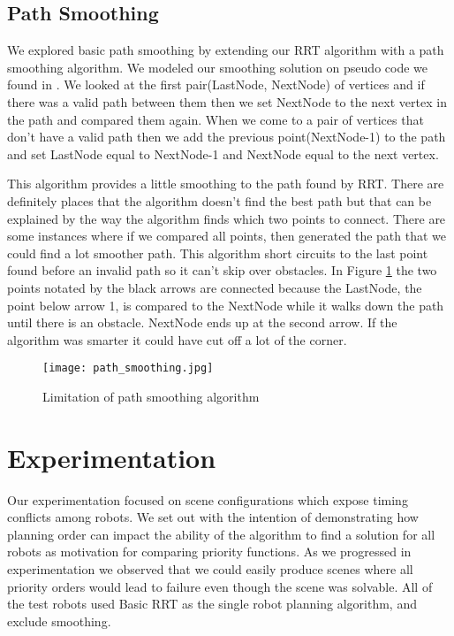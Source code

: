 \documentclass[12pt,journal,compsoc]{IEEEtran}
\begin{document}
\subsection{Path Smoothing}
We explored basic path smoothing by extending our RRT algorithm with a path smoothing algorithm. We modeled our smoothing solution on pseudo code we found in \cite{jarvis}. We looked at the first pair(LastNode, NextNode) of vertices and if there was a valid path between them then we set NextNode to the next vertex in the path and compared them again.  When we come to a pair of vertices that don't have a valid path then we add the previous point(NextNode-1) to the path and set LastNode equal to NextNode-1 and NextNode equal to the next vertex.  
\par
This algorithm provides a little smoothing to the path found by RRT.  There are definitely places that the algorithm doesn't find the best path but that can be explained by the way the algorithm finds which two points to connect.   There are some instances where if we compared all points, then generated the path that we could find a lot smoother path.  This algorithm short circuits to the last point found before an invalid path so it can't skip over obstacles.  In Figure \ref{fig:smoothing} the two points notated by the black arrows are connected because the LastNode, the point below arrow 1, is compared to the NextNode while it walks down the path until there is an obstacle.  NextNode ends up at the second arrow.  If the algorithm was smarter it could have cut off a lot of the corner.

\begin{figure}[ht]
\centering
{\texttt{[image: path\_smoothing.jpg]}}
\caption{Limitation of path smoothing algorithm}\label{fig:smoothing}
\end{figure}

\section{Experimentation}
Our experimentation focused on scene configurations which expose timing conflicts among robots. We set out with the intention of demonstrating how planning order can impact the ability of the algorithm to find a solution for all robots as motivation for comparing priority functions. As we progressed in experimentation we observed that we could easily produce scenes where all priority orders would lead to failure even though the scene was solvable. All of the test robots used Basic RRT as the single robot planning algorithm, and exclude smoothing.
\end{document}
